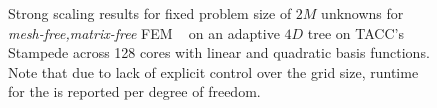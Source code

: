 \begin{figure}[tbh]
 \caption{Strong scaling results for fixed problem size of $2M$ unknowns for \textit{mesh-free,matrix-free} FEM \mvec~ on an adaptive $4D$ tree on TACC's Stampede across 128 cores with linear and quadratic basis functions. Note that due to lack of explicit control over the grid size, runtime for the \mvec is reported per degree of freedom.}
 \label{fig:ss_stampede2}
\end{figure}
